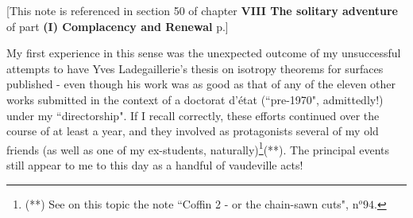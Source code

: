 \label{note:50} [This note is referenced in section 50 of chapter \textbf{VIII The solitary adventure} of part \textbf{(I) Complacency and Renewal} p.]

My first experience in this sense was the unexpected outcome of my unsuccessful attempts to have Yves Ladegaillerie's thesis on isotropy theorems for surfaces published - even though his work was as good as that of any of the eleven other works submitted in the context of a doctorat d'\'etat (``pre-1970", admittedly!) under my ``directorship". If I recall correctly, these efforts continued over the course of at least a year, and they involved as protagonists several of my old friends (as well as one of my ex-students, naturally)\footnote{(**) See on this topic the note ``Coffin 2 - or the chain-sawn cuts", n$^o 94$.}(**). 
The principal events still appear to me to this day as a handful of vaudeville acts!

